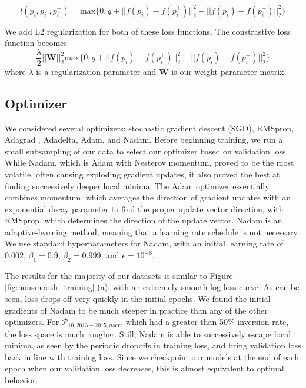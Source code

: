 \begin{equation} \label{eq:Wang_loss}
l(p_i, p_i^+, p_i^-) = \text{max}\{0, g + ||f(p_i) - f(p_i^+)||_2^2 - ||f(p_i)-f(p_i^-)||_2^2\}
\end{equation}

We add L2 regularization for both of these loss functions. The constrastive loss function becomes
\begin{equation}
\dfrac{\lambda}{2}||\mathbf{W}||_2^2 \text{max}\{0, g + ||f(p_i) - f(p_i^+)||_2^2 - ||f(p_i)-f(p_i^-)||_2^2\}
\end{equation}
where $\lambda$ is a regularization parameter and $\mathbf{W}$ is our weight parameter matrix.

\subsection{Optimizer}

We considered several optimizers: stochastic gradient descent (SGD), RMSprop\cite{tieleman2012lecture}, Adagrad \cite{duchi2011adaptive}, Adadelta\cite{zeiler2012adadelta}, Adam\cite{kingma2014adam}, and Nadam\cite{kingma2014adam}. Before beginning training, we run a small subsampling of our data to select our optimizer based on validation loss. While Nadam, which is Adam with Nesterov momentum, proved to be the most volatile, often causing exploding gradient updates, it also proved the best at finding successively deeper local minima. The Adam optimizer essentially combines momentum, which averages the direction of gradient updates with an exponential decay parameter to find the proper update vector direction, with RMSprop, which determines the direction of the update vector. Nadam is an adaptive-learning method, meaning that a learning rate schedule is not necessary. We use standard hyperparameters for Nadam, with an initial learning rate of 0.002, $\beta_1=0.9$, $\beta_2=0.999$, and $\epsilon=10^{-8}$.

The results for the majority of our datasets is similar to Figure \ref{fig:nonsmooth_training} (a), with an extremely smooth log-loss curve. As can be seen, loss drops off very quickly in the initial epochs. We found the initial gradients of Nadam to be much steeper in practice than any of the other optimizers. For $\mathcal{P}_{10,2013-2015,user}$, which had a greater than 50\% inversion rate, the loss space is much rougher. Still, Nadam is able to successively escape local minima, as seen by the periodic dropoffs in training loss, and bring validation loss back in line with training loss. Since we checkpoint our models at the end of each epoch when our validation loss decreases, this is almost equivalent to optimal behavior.

